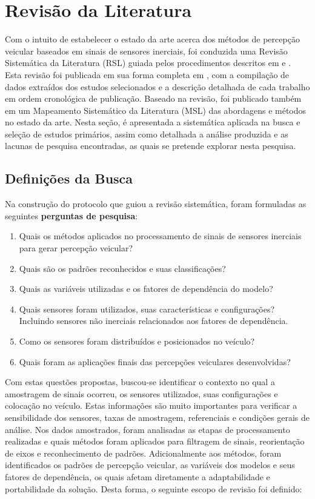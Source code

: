 \chapter{Revisão da Literatura}
\label{cap:revisao}

Com o intuito de estabelecer o estado da arte acerca dos métodos de percepção veicular baseados em sinais de sensores inerciais, foi conduzida uma Revisão Sistemática da Literatura (RSL) guiada pelos procedimentos descritos em \cite{kitchenham2009} e \cite{biolchini2005}. Esta revisão foi publicada em sua forma completa em \cite{menegazzo2018}, com a compilação de dados extraídos dos estudos selecionados e a descrição detalhada de cada trabalho em ordem cronológica de publicação. Baseado na revisão, foi publicado também em \cite{menegazzo2020} um Mapeamento Sistemático da Literatura (MSL) das abordagens e métodos no estado da arte. Nesta seção, é apresentada a sistemática aplicada na busca e seleção de estudos primários, assim como detalhada a análise produzida e as lacunas de pesquisa encontradas, as quais se pretende explorar nesta pesquisa. 

\section{Definições da Busca}

Na construção do protocolo que guiou a revisão sistemática, foram formuladas as seguintes \textbf{perguntas de pesquisa}:

\begin{enumerate}
\item Quais os métodos aplicados no processamento de sinais de sensores inerciais para gerar percepção veicular?
\item Quais são os padrões reconhecidos e suas classificações?
\item Quais as variáveis utilizadas e os fatores de dependência do modelo?
\item Quais sensores foram utilizados, suas características e configurações? Incluindo sensores não inerciais relacionados aos fatores de dependência.
\item Como os sensores foram distribuídos e posicionados no veículo?
\item Quais foram as aplicações finais das percepções veiculares desenvolvidas?
\end{enumerate}

Com estas questões propostas, buscou-se identificar o contexto no qual a amostragem de sinais ocorreu, os sensores utilizados, suas configurações e colocação no veículo. Estas informações são muito importantes para verificar a sensibilidade dos sensores, taxas de amostragem, referenciais e condições gerais de análise. Nos dados amostrados, foram analisadas as etapas de processamento realizadas e quais métodos foram aplicados para filtragem de sinais, reorientação de eixos e reconhecimento de padrões. Adicionalmente aos métodos, foram identificados os padrões de percepção veicular, as variáveis dos modelos e seus fatores de dependência, os quais afetam diretamente a adaptabilidade e portabilidade da solução. Desta forma, o seguinte escopo de revisão foi definido:

